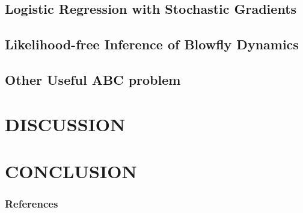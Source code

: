 \documentclass[]{article}
\begin{document}
\subsection{Logistic Regression with Stochastic Gradients}

\subsection{Likelihood-free Inference of Blowfly Dynamics}

\subsection{Other Useful ABC problem}

\section{DISCUSSION} \label{discussion}

\section{CONCLUSION} \label{conclusion}

\subsubsection*{References}
\newpage
{

}
\end{document}
